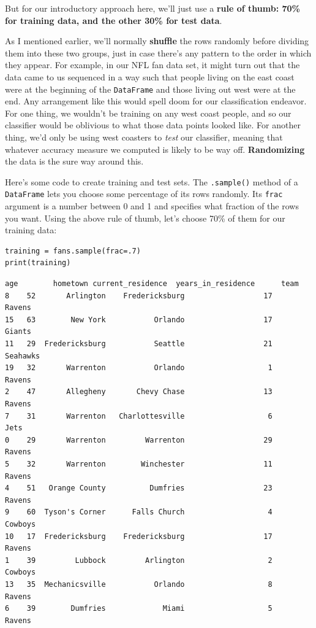 But for our introductory approach here, we'll just use a \textbf{rule of thumb:
70\% for training data, and the other 30\% for test data}.

As I mentioned earlier, we'll normally \textbf{shuffle} the rows randomly
before dividing them into these two groups, just in case there's any pattern to
the order in which they appear. For example, in our NFL fan data set, it might
turn out that the data came to us sequenced in a way such that people living on
the east coast were at the beginning of the \texttt{DataFrame} and those living
out west were at the end. Any arrangement like this would spell doom for our
classification endeavor. For one thing, we wouldn't be training on any west
coast people, and so our classifier would be oblivious to what those data
points looked like. For another thing, we'd only be using west coasters to
\textit{test} our classifier, meaning that whatever accuracy measure we
computed is likely to be way off. \textbf{Randomizing} the data is the sure way
around this.

\label{sampleRows}

Here's some code to create training and test sets. The \texttt{.sample()}
method of a \texttt{DataFrame} lets you choose some percentage of its rows 
randomly. Its \texttt{frac} argument is a number between 0 and 1 and specifies
what fraction of the rows you want. Using the above rule of thumb, let's choose
70\% of them for our training data:

\begin{Verbatim}[fontsize=\small,samepage=true,frame=single,framesep=3mm]
training = fans.sample(frac=.7)
print(training)
\end{Verbatim}
\vspace{-.2in}

\begin{Verbatim}[fontsize=\CBCodeSmall,samepage=true,frame=leftline,framesep=5mm,framerule=1mm]
    age        hometown current_residence  years_in_residence      team
8    52       Arlington    Fredericksburg                  17    Ravens
15   63        New York           Orlando                  17    Giants
11   29  Fredericksburg           Seattle                  21  Seahawks
19   32       Warrenton           Orlando                   1    Ravens
2    47       Allegheny       Chevy Chase                  13    Ravens
7    31       Warrenton   Charlottesville                   6      Jets
0    29       Warrenton         Warrenton                  29    Ravens
5    32       Warrenton        Winchester                  11    Ravens
4    51   Orange County          Dumfries                  23    Ravens
9    60  Tyson's Corner      Falls Church                   4   Cowboys
10   17  Fredericksburg    Fredericksburg                  17    Ravens
1    39         Lubbock         Arlington                   2   Cowboys
13   35  Mechanicsville           Orlando                   8    Ravens
6    39        Dumfries             Miami                   5    Ravens
\end{Verbatim}

